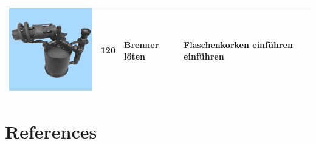 \documentclass[
  english,
  doc,12pt,twoside,floatsintext]{apa7}
\begin{document}
\begin{center}
\begin{ThreePartTable}
\begin{longtable}{llll}
\includegraphics[valign=c, scale=0.2]{../materials/unfamiliar/120.png} & 120 & Brenner löten & Flaschenkorken einführen einführen\\
\bottomrule
\end{longtable}

\end{ThreePartTable}
\end{center}

\newpage

\hypertarget{references}{%
\section*{References}\label{references}}

\setlength{\parindent}{-0.5in}
\end{document}
